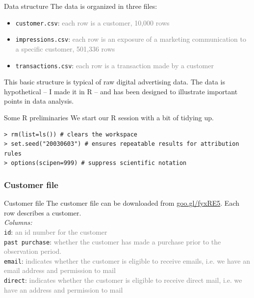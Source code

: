 \documentclass[10pt, aspectratio=169]{beamer}
\begin{document}
\begin{frame}{Data structure}
The data is organized in three files: \\
\begin{itemize}
\item \texttt{customer.csv}: \textcolor{gray}{each row is a customer, 10,000 rows}
\item \texttt{impressions.csv}: \textcolor{gray}{each row is an exposure of a marketing communication to a specific customer, 501,336 rows}
\item \texttt{transactions.csv}: \textcolor{gray}{each row is a transaction made by a customer}
\end{itemize}
\pause This basic structure is typical of raw digital advertising data. The data is hypothetical -- I made it in R -- and has been designed to illustrate important points in data analysis. \\
\end{frame}

\begin{frame}[fragile]{Some R preliminaries}
We start our R session with a bit of tidying up. 
\begin{lstlisting}
> rm(list=ls()) # clears the workspace
> set.seed("20030603") # ensures repeatable results for attribution rules
> options(scipen=999) # suppress scientific notation
\end{lstlisting}
\end{frame}

\subsubsection{Customer file}

\begin{frame}[fragile]{\alert{Customer file}}
The customer file can be downloaded from \href{goo.gl/fyxRE5}{goo.gl/fyxRE5}. Each row describes a customer. \\
\bigskip
\emph{Columns:} \\
\verb|id|: \textcolor{gray}{an id number for the customer}\\
\verb|past purchase|: \textcolor{gray}{whether the customer has made a purchase prior to the observation period.} \\
\verb|email|: \textcolor{gray}{indicates whether the customer is eligible to receive emails, i.e. we have an email address and permission to mail}\\
\verb|direct|: \textcolor{gray}{indicates whether the customer is eligible to receive direct mail, i.e. we have an address and permission to mail}\\
\end{frame}
\end{document}
